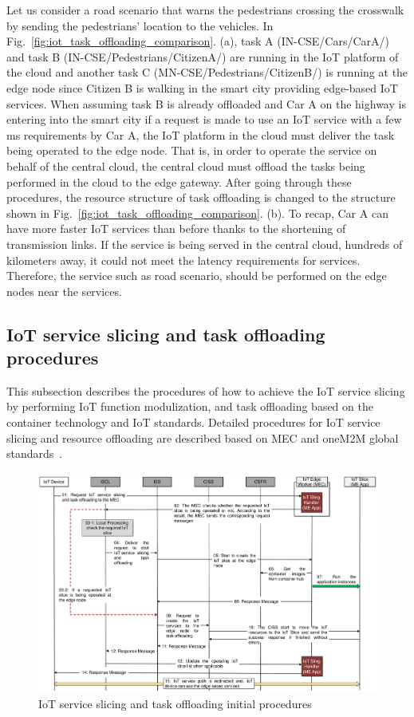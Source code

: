 Let us consider a road scenario that warns the pedestrians crossing the crosswalk by sending the pedestrians' location to the vehicles. In Fig.~\ref{fig:iot_task_offloading_comparison}. (a), task A (IN-CSE/Cars/CarA/) and task B (IN-CSE/Pedestrians/CitizenA/) are running in the IoT platform of the cloud and another task C (MN-CSE/Pedestrians/CitizenB/)  is running at the edge node since Citizen B is walking in the smart city providing edge-based IoT services. When assuming task B is already offloaded and Car A on the highway is entering into the smart city if a request is made to use an IoT service with a few ms requirements by Car A, the IoT platform in the cloud must deliver the task being operated to the edge node. 
That is, in order to operate the service on behalf of the central cloud, the central cloud must offload the tasks being performed in the cloud to the edge gateway. After going through these procedures, the resource structure of task offloading is changed to the structure shown in Fig.~\ref{fig:iot_task_offloading_comparison}. (b). To recap, Car A can have more faster IoT services than before thanks to the shortening of transmission links. If the service is being served in the central cloud, hundreds of kilometers away, it could not meet the latency requirements for services. Therefore, the service such as road scenario, should be performed on the edge nodes near the services.

\subsection{IoT service slicing and task offloading procedures}
This subsection describes the procedures of how to achieve the IoT service slicing by performing IoT function modulization, and task offloading based on the container technology and IoT standards. Detailed procedures for IoT service slicing and resource offloading are described based on MEC and oneM2M global standards~\cite{marques2019internet, 2020_onem2m_tr_0052}. 

\begin{figure}
\centering
\includegraphics[angle=90, width=1\textwidth]
{figures/fig_IoT_slicing_resource_slicing_procedures.pdf}
\caption{IoT service slicing and task offloading initial procedures}
\label{fig:iot_task_offloading_procedures}
\end{figure}

